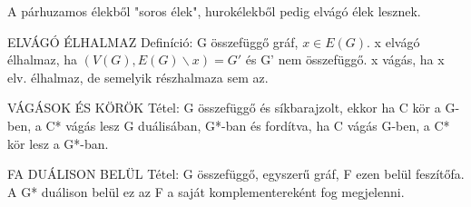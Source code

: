 A párhuzamos élekből "soros élek", hurokélekből pedig elvágó élek lesznek.
\begin{shaded}
ELVÁGÓ ÉLHALMAZ Definíció: G összefüggő gráf, $x \in E(G)$. x elvágó élhalmaz, ha $(V(G),E(G)\backslash x) = G'$ és G' nem összefüggő. x vágás, ha x elv. élhalmaz, de semelyik részhalmaza sem az.
\end{shaded}
\begin{framed}
VÁGÁSOK ÉS KÖRÖK Tétel: G összefüggő és síkbarajzolt, ekkor ha C kör a G-ben, a C* vágás lesz G duálisában, G*-ban és fordítva, ha C vágás G-ben, a C* kör lesz a G*-ban.
\end{framed}
\begin{framed}
FA DUÁLISON BELÜL Tétel: G összefüggő, egyszerű gráf, F ezen belül feszítőfa. A G* duálison belül ez az F a saját komplementereként fog megjelenni.
\end{framed}
